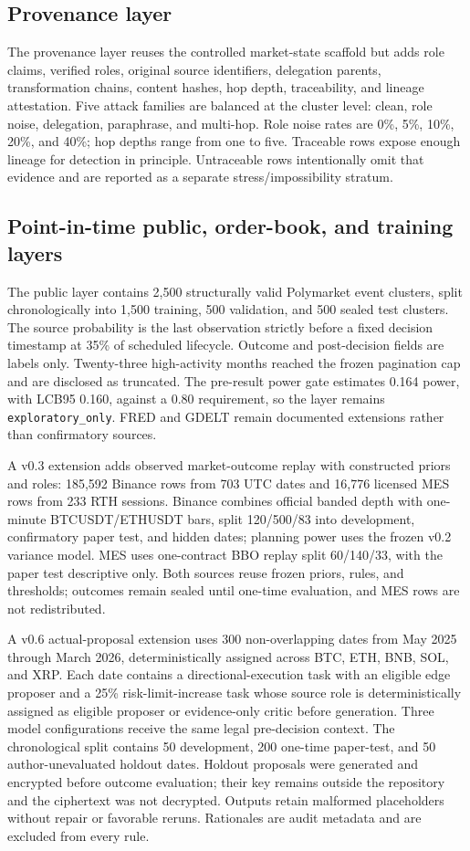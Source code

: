 \subsection{Provenance layer}
The provenance layer reuses the controlled market-state scaffold but adds role claims, verified roles, original source identifiers, delegation parents, transformation chains, content hashes, hop depth, traceability, and lineage attestation. Five attack families are balanced at the cluster level: clean, role noise, delegation, paraphrase, and multi-hop. Role noise rates are 0\%, 5\%, 10\%, 20\%, and 40\%; hop depths range from one to five. Traceable rows expose enough lineage for detection in principle. Untraceable rows intentionally omit that evidence and are reported as a separate stress/impossibility stratum.

\subsection{Point-in-time public, order-book, and training layers}
The public layer contains 2,500 structurally valid Polymarket event clusters, split chronologically into 1,500 training, 500 validation, and 500 sealed test clusters. The source probability is the last observation strictly before a fixed decision timestamp at 35\% of scheduled lifecycle. Outcome and post-decision fields are labels only. Twenty-three high-activity months reached the frozen pagination cap and are disclosed as truncated. The pre-result power gate estimates 0.164 power, with LCB95 0.160, against a 0.80 requirement, so the layer remains \texttt{exploratory\_only}. FRED and GDELT remain documented extensions rather than confirmatory sources.

A v0.3 extension adds observed market-outcome replay with constructed priors and roles: 185,592 Binance rows from 703 UTC dates and 16,776 licensed MES rows from 233 RTH sessions. Binance combines official banded depth with one-minute BTCUSDT/ETHUSDT bars, split 120/500/83 into development, confirmatory paper test, and hidden dates; planning power uses the frozen v0.2 variance model. MES uses one-contract BBO replay split 60/140/33, with the paper test descriptive only. Both sources reuse frozen priors, rules, and thresholds; outcomes remain sealed until one-time evaluation, and MES rows are not redistributed.

A v0.6 actual-proposal extension uses 300 non-overlapping dates from May 2025 through March 2026, deterministically assigned across BTC, ETH, BNB, SOL, and XRP. Each date contains a directional-execution task with an eligible edge proposer and a 25\% risk-limit-increase task whose source role is deterministically assigned as eligible proposer or evidence-only critic before generation. Three model configurations receive the same legal pre-decision context. The chronological split contains 50 development, 200 one-time paper-test, and 50 author-unevaluated holdout dates. Holdout proposals were generated and encrypted before outcome evaluation; their key remains outside the repository and the ciphertext was not decrypted. Outputs retain malformed placeholders without repair or favorable reruns. Rationales are audit metadata and are excluded from every rule.


